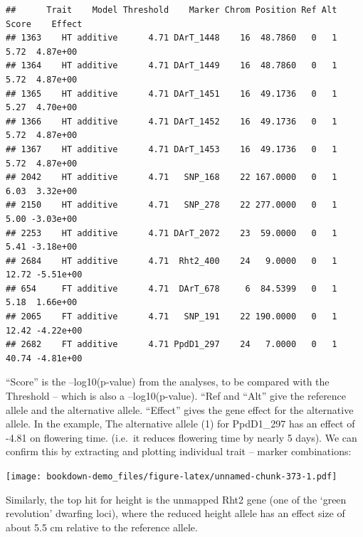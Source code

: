 \documentclass[
]{book}
\newenvironment{Shaded}{\begin{snugshade}}{\end{snugshade}}
\newcommand{\AttributeTok}[1]{\textcolor[rgb]{0.77,0.63,0.00}{#1}}
\newcommand{\FunctionTok}[1]{\textcolor[rgb]{0.00,0.00,0.00}{#1}}
\newcommand{\NormalTok}[1]{#1}
\newcommand{\SpecialCharTok}[1]{\textcolor[rgb]{0.00,0.00,0.00}{#1}}
\begin{document}
\begin{verbatim}
##      Trait    Model Threshold    Marker Chrom Position Ref Alt Score    Effect
## 1363    HT additive      4.71 DArT_1448    16  48.7860   0   1  5.72  4.87e+00
## 1364    HT additive      4.71 DArT_1449    16  48.7860   0   1  5.72  4.87e+00
## 1365    HT additive      4.71 DArT_1451    16  49.1736   0   1  5.27  4.70e+00
## 1366    HT additive      4.71 DArT_1452    16  49.1736   0   1  5.72  4.87e+00
## 1367    HT additive      4.71 DArT_1453    16  49.1736   0   1  5.72  4.87e+00
## 2042    HT additive      4.71   SNP_168    22 167.0000   0   1  6.03  3.32e+00
## 2150    HT additive      4.71   SNP_278    22 277.0000   0   1  5.00 -3.03e+00
## 2253    HT additive      4.71 DArT_2072    23  59.0000   0   1  5.41 -3.18e+00
## 2684    HT additive      4.71  Rht2_400    24   9.0000   0   1 12.72 -5.51e+00
## 654     FT additive      4.71  DArT_678     6  84.5399   0   1  5.18  1.66e+00
## 2065    FT additive      4.71   SNP_191    22 190.0000   0   1 12.42 -4.22e+00
## 2682    FT additive      4.71 PpdD1_297    24   7.0000   0   1 40.74 -4.81e+00
\end{verbatim}

``Score'' is the --log10(p-value) from the analyses, to be compared with the Threshold -- which is also a --log10(p-value). ``Ref and ``Alt'' give the reference allele and the alternative allele. ``Effect'' gives the gene effect for the alternative allele. In the example, The alternative allele (1) for PpdD1\_297 has an effect of -4.81 on flowering time. (i.e.~it reduces flowering time by nearly 5 days). We can confirm this by extracting and plotting individual trait -- marker combinations:

\begin{Shaded}
\end{Shaded}

\texttt{[image: bookdown-demo\_files/figure-latex/unnamed-chunk-373-1.pdf]}

Similarly, the top hit for height is the unmapped Rht2 gene (one of the `green revolution' dwarfing loci), where the reduced height allele has an effect size of about 5.5 cm relative to the reference allele.
\end{document}
